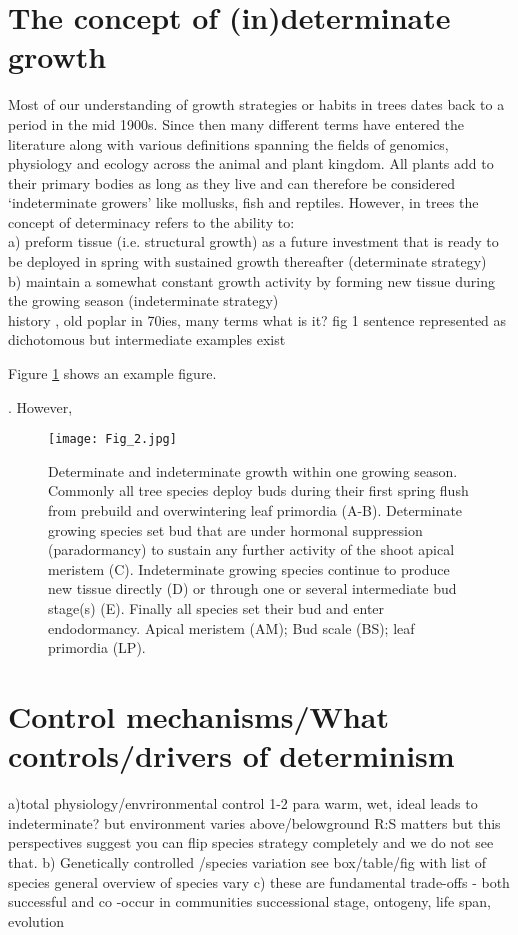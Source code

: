 \documentclass{article}
\begin{document}
	
\section*{The concept of (in)determinate growth}
Most of our understanding of growth strategies or habits in trees dates back to a period in the mid 1900s. Since then many different terms have entered the literature along with various definitions spanning the fields of genomics, physiology and ecology across the animal and plant kingdom. All plants add to their primary bodies as long as they live and can therefore be considered ‘indeterminate growers’ like mollusks, fish and reptiles. However, in trees the concept of determinacy refers to the ability to:\\
a) preform tissue (i.e. structural growth) as a future investment that is ready to be deployed in spring with sustained growth thereafter (determinate strategy)\\
b) maintain a somewhat constant growth activity by forming new tissue during the growing season (indeterminate strategy)\\





	history , old poplar in 70ies, many terms
	what is it? fig
	1 sentence represented as dichotomous but intermediate examples exist
	
		Figure \ref{fig:fig_2xxx} shows an example figure.
	
	 \citep{ejsmondHowTimeGrowth2010}. However, 
	
	
								\begin{figure}
								\centering
								\texttt{[image: Fig\_2.jpg]} 
								\caption{Determinate and indeterminate growth within one growing season. Commonly all tree species deploy buds during their first spring flush from prebuild and overwintering leaf primordia (A-B). Determinate growing species set bud that are under hormonal suppression (paradormancy) to sustain any further activity of the shoot apical meristem (C). Indeterminate growing species continue to produce new tissue directly (D) or through one or several intermediate bud stage(s) (E). Finally all species set their bud and enter endodormancy. Apical meristem (AM); Bud scale (BS); leaf primordia (LP).}
								\label{fig:fig_2xxx}
								\end{figure}
	
\section*{Control mechanisms/What controls/drivers of determinism}
	a)total physiology/envrironmental control 1-2 para
	warm, wet, ideal leads to indeterminate?
	but environment varies above/belowground
	R:S matters
	but this perspectives suggest you can flip species strategy completely and we do not see that.
	b) Genetically controlled /species variation see box/table/fig with list of species
	general overview of species vary
	c) these are fundamental trade-offs - both successful and co -occur in communities
	successional stage, ontogeny, life span, evolution
	
\end{document}
